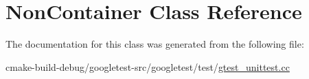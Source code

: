 \hypertarget{classNonContainer}{}\section{Non\+Container Class Reference}
\label{classNonContainer}


The documentation for this class was generated from the following file\+:\begin{DoxyCompactItemize}
\item 
cmake-\/build-\/debug/googletest-\/src/googletest/test/\mbox{\hyperlink{gtest__unittest_8cc}{gtest\+\_\+unittest.\+cc}}\end{DoxyCompactItemize}
